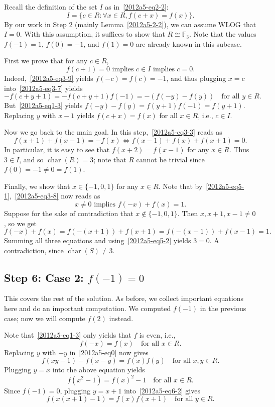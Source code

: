 \documentclass{article}
\newcommand{\F}{\mathbb{F}}
\DeclareMathOperator{\rchar}{char}
\begin{document}
Recall the definition of the set $I$ as in~\eqref{2012a5-eq2-2}:
\[ I = \{c \in R : \forall x \in R, f(c + x) = f(x)\}. \]
By our work in Step 2 (mainly Lemma~\ref{2012a5-2-2}), we can assume WLOG that $I = 0$.
With this assumption, it suffices to show that $R \cong \F_3$.
Note that the values $f(-1) = 1$, $f(0) = -1$, and $f(1) = 0$ are already known in this subcase.

First we prove that for any $c \in R$,
\[ f(c + 1) = 0 \text{ implies } c \in I \text{ implies } c = 0. \tag{5.1}\label{2012a5-eq5-1} \]
Indeed,~\eqref{2012a5-eq3-9} yields $f(-c) = f(c) = -1$, and thus plugging $x = c$ into~\eqref{2012a5-eq3-7} yields
\[ -f(c + y + 1) = -f(c + y + 1) f(-1) = -(f(-y) - f(y)) \quad \text{for all } y \in R. \]
But~\eqref{2012a5-eq1-3} yields $f(-y) - f(y) = f(y + 1) f(-1) = f(y + 1)$.
Replacing $y$ with $x - 1$ yields $f(c + x) = f(x)$ for all $x \in R$, i.e., $c \in I$.

Now we go back to the main goal.
In this step,~\eqref{2012a5-eq3-3} reads as
\[ f(x + 1) + f(x - 1) = -f(x) \iff f(x - 1) + f(x) + f(x + 1) = 0. \tag{5.2}\label{2012a5-eq5-2} \]
In particular, it is easy to see that $f(x + 2) = f(x - 1)$ for any $x \in R$.
Thus $3 \in I$, and so $\rchar(R) = 3$; note that $R$ cannot be trivial since $f(0) = -1 \neq 0 = f(1)$.

Finally, we show that $x \in \{-1, 0, 1\}$ for any $x \in R$.
Note that by~\eqref{2012a5-eq5-1},~\eqref{2012a5-eq3-8} now reads as
\[ x \neq 0 \text{ implies } f(-x) + f(x) = 1. \tag{5.3}\label{2012a5-eq5-3} \]
Suppose for the sake of contradiction that $x \notin \{-1, 0, 1\}$.
Then $x, x + 1, x - 1 \neq 0$, so we get
\[ f(-x) + f(x) = f(-(x + 1)) + f(x + 1) = f(-(x - 1)) + f(x - 1) = 1. \]
Summing all three equations and using~\eqref{2012a5-eq5-2} yields $3 = 0$.
A contradiction, since $\rchar(S) \neq 3$.









\subsection*{Step 6: Case 2: $f(-1) = 0$}

This covers the rest of the solution.
As before, we collect important equations here and do an important computation.
We computed $f(-1)$ in the previous case; now we will compute $f(2)$ instead.

Note that~\eqref{2012a5-eq1-3} only yields that $f$ is even, i.e.,
\[ f(-x) = f(x) \quad \text{for all } x \in R. \tag{6.1}\label{2012a5-eq6-1} \]
Replacing $y$ with $-y$ in~\eqref{2012a5-eq0} now gives
\[ f(xy - 1) - f(x - y) = f(x) f(y) \quad \text{for all } x, y \in R. \tag{6.2}\label{2012a5-eq6-2} \]
Plugging $y = x$ into the above equation yields
\[ f(x^2 - 1) = f(x)^2 - 1 \quad \text{for all } x \in R. \tag{6.3}\label{2012a5-eq6-3} \]
Since $f(-1) = 0$, plugging $y = x + 1$ into~\eqref{2012a5-eq6-2} gives
\[ f(x(x + 1) - 1) = f(x) f(x + 1) \quad \text{for all } y \in R. \tag{6.4}\label{2012a5-eq6-4} \]
\end{document}
